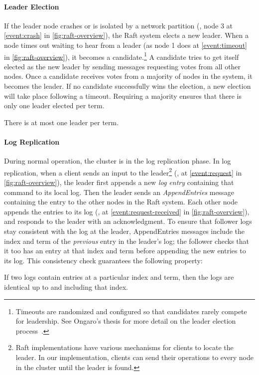 \paragraph*{Leader Election}
If the leader node crashes or is isolated by a network
partition (\eg, node 3 at \cref{event:crash} in \cref{fig:raft-overview}),
the Raft system elects a new leader.
When a node times out waiting to hear from a leader
(as node 1 does at \cref{event:timeout} in \cref{fig:raft-overview}),
it becomes a candidate.\footnote{Timeouts are randomized and configured so that candidates rarely compete for leadership. See Ongaro's thesis for more detail on the leader election process~\cite{ongaro:phd}.}
A candidate tries to get itself elected as the new leader
by sending messages requesting votes from all other nodes.
Once a candidate receives votes from a majority of nodes in the system,
it becomes the leader.
If no candidate successfully wins the election,
a new election will take place following a timeout.
Requiring a majority ensures that there is only one leader elected per term.
\begin{proposition}
  There is at most one leader per term.
\end{proposition}

\paragraph*{Log Replication}
During normal operation,
  the cluster is in the log replication phase.
In log replication,
  when a client sends an input to
  the leader\footnote{Raft implementations have various mechanisms
    for clients to locate the leader. In our implementation, clients
    can send their operations to every node in the cluster until the
    leader is found.}
  (\eg, at \cref{event:request} in \cref{fig:raft-overview}),
  the leader first appends a new \emph{log entry}
  containing that command to its local log.
Then the leader sends an \emph{AppendEntries} message
  containing the entry to the other nodes in the Raft system.
Each other node appends the entries to its log
  (\eg, at \cref{event:request-received} in \cref{fig:raft-overview}),
  and responds to the leader with an acknowledgment.
To ensure that follower logs stay consistent
  with the log at the leader,
  AppendEntries messages include the index and term
  of the \textit{previous} entry in the leader's log;
  the follower checks that
  it too has an entry at that index and term
  before appending the new entries to its log.
This consistency check guarantees the following property:
\begin{proposition}
  If two logs contain entries at a particular index and term,
  then the logs are identical up to and including that index.
\end{proposition}


